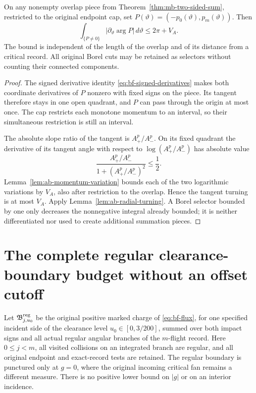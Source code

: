 \begin{corollary}
\label{cor:ab-complete-piece-turning}
On any nonempty overlap piece from
Theorem~\ref{thm:mb-two-sided-sum}, restricted to the original
endpoint cap, set $P(\vartheta)=(-p_0(\vartheta),p_m(\vartheta))$.
Then
\begin{equation}\label{eq:ab-piece-turning}
 \int_{\{P\ne0\}}|\partial_\vartheta\arg P|\,d\vartheta
                         \le 2\pi+V_A.
\end{equation}
The bound is independent of the length of the overlap and of its
distance from a critical record.  All original Borel cuts may be
retained as selectors without counting their connected components.
\end{corollary}
\begin{proof}
The signed derivative identity \eqref{eq:bf-signed-derivatives}
makes both coordinate derivatives of $P$ nonzero with fixed signs
on the piece.  Its tangent therefore stays in one open quadrant,
and $P$ can pass through the origin at most once.  The cap restricts
each monotone momentum to an interval, so their simultaneous
restriction is still an interval.

The absolute slope ratio of the tangent is $A_+^p/A_-^p$.  On its
fixed quadrant the derivative of its tangent angle with respect to
$\log(A_+^p/A_-^p)$ has absolute value
\[
 \frac{A_+^p/A_-^p}{1+(A_+^p/A_-^p)^2}\le\frac12.
\]
Lemma~\ref{lem:ab-momentum-variation} bounds each of the two
logarithmic variations by $V_A$, also after restriction to the
overlap.  Hence the tangent turning is at most $V_A$.  Apply
Lemma~\ref{lem:ab-radial-turning}.  A Borel selector bounded by one
only decreases the nonnegative integral already bounded; it is
neither differentiated nor used to create additional summation pieces.
\end{proof}

\section{The complete regular clearance-boundary budget without an offset cutoff}
\label{sec:ab-all-offset}

Let $\mathfrak B^{\rm reg}_{j,u_0}$ be the original positive marked
charge of \eqref{eq:bf-flux}, for one specified incident side of the
clearance level $u_0\in[0,3/200]$, summed over both impact signs and
all actual regular angular branches of the $m$-flight record.
Here $0\le j<m$, all visited collisions on an integrated branch are
regular, and all original endpoint and exact-record tests are retained.
The regular boundary is punctured only at $g=0$, where the original
incoming critical fan remains a different measure.  There is no
positive lower bound on $|g|$ or on an interior incidence.

